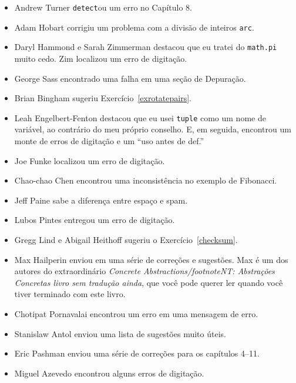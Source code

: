 \documentclass[10pt]{book}
\begin{document}
\begin {itemize}
\item Andrew Turner {\tt detect}ou um erro no Capítulo 8.

\item Adam Hobart corrigiu um problema com a divisão de inteiros {\tt arc}.

\item Daryl Hammond e Sarah Zimmerman destacou que eu tratei do
{\tt math.pi} muito cedo. Zim localizou um erro de digitação.

\item George Sass encontrado uma falha em uma seção de Depuração.

\item Brian Bingham sugeriu Exercício~\ref{exrotatepairs}.

\item Leah Engelbert-Fenton destacou que eu usei {\tt tuple}
como um nome de variável, ao contrário do meu próprio conselho. E, em seguida, encontrou
um monte de erros de digitação e um ``uso antes de def.''

\item Joe Funke localizou um erro de digitação.

\item Chao-chao Chen encontrou uma inconsistência no exemplo de Fibonacci.

\item Jeff Paine sabe a diferença entre espaço e spam.

\item Lubos Pintes entregou um erro de digitação.

\item Gregg Lind e Abigail Heithoff sugeriu o Exercício~\ref{checksum}.

\item Max Hailperin enviou em uma série de correções e
  sugestões. Max é um dos autores do extraordinário {\em
    Concrete Abstractions/footnote{NT: Abstrações Concretas livro sem tradução ainda}}, que você pode querer ler quando você tiver
  terminado com este livro.

\item Chotipat Pornavalai encontrou um erro em uma mensagem de erro.

\item Stanislaw Antol enviou uma lista de sugestões muito úteis.

\item Eric Pashman enviou uma série de correções para os capítulos 4--11.

\item Miguel Azevedo encontrou alguns erros de digitação.


\end{itemize}
\end{document}
